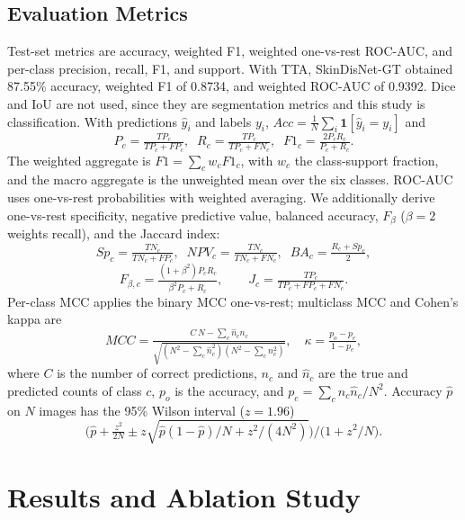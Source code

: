 \documentclass[conference]{IEEEtran}
\begin{document}
\subsection{Evaluation Metrics}
Test-set metrics are accuracy, weighted F1, weighted one-vs-rest ROC-AUC, and per-class precision, recall, F1, and support. With TTA, SkinDisNet-GT obtained 87.55\% accuracy, weighted F1 of 0.8734, and weighted ROC-AUC of 0.9392. Dice and IoU are not used, since they are segmentation metrics and this study is classification. With predictions $\hat{y}_i$ and labels $y_i$, $Acc = \frac{1}{N} \sum_{i} \mathbf{1}[\hat{y}_i = y_i]$ and
\begin{equation}
P_c = \tfrac{TP_c}{TP_c + FP_c}, \;\; R_c = \tfrac{TP_c}{TP_c + FN_c}, \;\; F1_c = \tfrac{2 P_c R_c}{P_c + R_c}.
\label{eq:prec_recall}
\end{equation}
The weighted aggregate is $F1 = \sum_{c} w_c F1_c$, with $w_c$ the class-support fraction, and the macro aggregate is the unweighted mean over the six classes. ROC-AUC uses one-vs-rest probabilities with weighted averaging. We additionally derive one-vs-rest specificity, negative predictive value, balanced accuracy, $F_\beta$ ($\beta=2$ weights recall), and the Jaccard index:
\begin{equation}
Sp_c = \tfrac{TN_c}{TN_c+FP_c}, \;\; NPV_c = \tfrac{TN_c}{TN_c+FN_c}, \;\; BA_c = \tfrac{R_c+Sp_c}{2},
\label{eq:spec}
\end{equation}
\begin{equation}
F_{\beta,c} = \tfrac{(1+\beta^2)P_cR_c}{\beta^2P_c+R_c}, \qquad J_c = \tfrac{TP_c}{TP_c+FP_c+FN_c}.
\label{eq:fbeta}
\end{equation}
Per-class MCC applies the binary MCC one-vs-rest; multiclass MCC and Cohen's kappa are
\begin{equation}
MCC = \tfrac{C\,N - \sum_c \hat{n}_c n_c}{\sqrt{(N^2-\sum_c \hat{n}_c^2)(N^2-\sum_c n_c^2)}}, \quad \kappa = \tfrac{p_o - p_e}{1 - p_e},
\label{eq:kappa}
\end{equation}
where $C$ is the number of correct predictions, $n_c$ and $\hat{n}_c$ are the true and predicted counts of class $c$, $p_o$ is the accuracy, and $p_e=\sum_c n_c\hat{n}_c/N^2$. Accuracy $\hat{p}$ on $N$ images has the 95\% Wilson interval ($z=1.96$)
\begin{equation}
\big(\hat{p} + \tfrac{z^2}{2N} \pm z\sqrt{\hat{p}(1-\hat{p})/N + z^2/(4N^2)}\big)\big/\big(1 + z^2/N\big).
\label{eq:wilson}
\end{equation}

\section{Results and Ablation Study}
\end{document}
